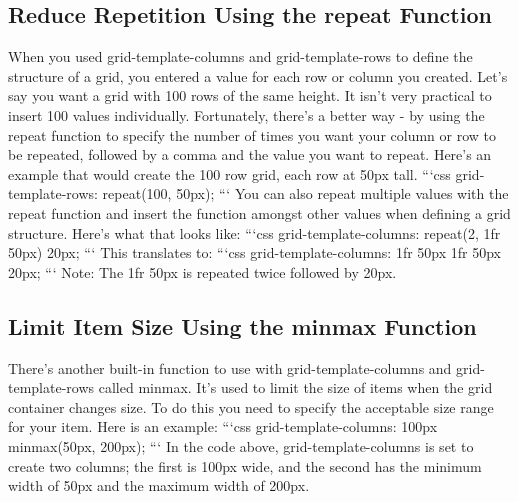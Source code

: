 \documentclass{article}%
\begin{document}
\subsection{Reduce Repetition Using the repeat Function}%
\label{subsec:ReduceRepetitionUsingtherepeatFunction}%
When you used grid{-}template{-}columns and grid{-}template{-}rows to define the structure of a grid, you entered a value for each row or column you created.\newline%
Let's say you want a grid with 100 rows of the same height. It isn't very practical to insert 100 values individually. Fortunately, there's a better way {-} by using the repeat function to specify the number of times you want your column or row to be repeated, followed by a comma and the value you want to repeat.\newline%
Here's an example that would create the 100 row grid, each row at 50px tall.\newline%
```css\newline%
grid{-}template{-}rows: repeat(100, 50px);\newline%
```\newline%
You can also repeat multiple values with the repeat function and insert the function amongst other values when defining a grid structure. Here's what that looks like:\newline%
```css\newline%
grid{-}template{-}columns: repeat(2, 1fr 50px) 20px;\newline%
```\newline%
This translates to:\newline%
```css\newline%
grid{-}template{-}columns: 1fr 50px 1fr 50px 20px;\newline%
```\newline%
Note: The 1fr 50px is repeated twice followed by 20px.\newline%

%
\subsection{Limit Item Size Using the minmax Function}%
\label{subsec:LimitItemSizeUsingtheminmaxFunction}%
There's another built{-}in function to use with grid{-}template{-}columns and grid{-}template{-}rows called minmax. It's used to limit the size of items when the grid container changes size. To do this you need to specify the acceptable size range for your item. Here is an example:\newline%
```css\newline%
grid{-}template{-}columns: 100px minmax(50px, 200px);\newline%
```\newline%
In the code above, grid{-}template{-}columns is set to create two columns; the first is 100px wide, and the second has the minimum width of 50px and the maximum width of 200px.\newline%
\end{document}
